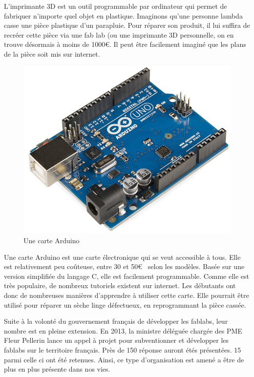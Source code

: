 L'imprimante 3D est un outil programmable par ordinateur qui permet de fabriquer n'importe quel objet en plastique. Imaginons qu'une personne lambda casse une pièce plastique d'un parapluie. Pour réparer son produit, il lui suffira de recréer cette pièce via une fab lab (ou une imprimante 3D personnelle, on en trouve désormais à moins de 1000\euro. Il peut être facilement imaginé que les plans de la pièce soit mis sur internet. 

\begin{figure}
\begin{center}
\vspace{-1cm}\includegraphics[scale=0.25]{Rsc/Arduino.png} 

\caption{Une carte Arduino}
\end{center}
\end{figure}

Une carte Arduino est une carte électronique qui se veut accessible à tous. Elle est relativement peu coûteuse, entre 30 et 50\euro~ selon les modèles. Basée sur une version simplifiée du langage C, elle est facilement programmable. Comme elle est très populaire, de nombreux tutoriels existent sur internet. Les débutants ont donc de nombreuses manières d'apprendre à utiliser cette carte. Elle pourrait être utilisé pour réparer un sèche linge défectueux, en reprogrammant la pièce cassée.

\medbreak

Suite à la volonté du gouvernement français de développer les fablabs, leur nombre est en pleine extension. En 2013, la ministre déléguée chargée des PME Fleur Pellerin lance un appel à projet pour subventionner et développer les fablabs sur le territoire français. Près de 150 réponse auront étés présentées. 15 parmi celle ci ont été retenues. Ainsi,  ce type d'organisation est amené a être de plus en plus présente dans nos vies. 

